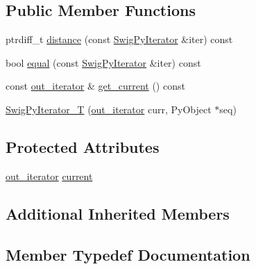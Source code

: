 \subsection*{Public Member Functions}
\begin{DoxyCompactItemize}
\item 
ptrdiff\+\_\+t \hyperlink{classswig_1_1_swig_py_iterator___t_ab98b853b7da59239d8b260be34dbda26}{distance} (const \hyperlink{structswig_1_1_swig_py_iterator}{Swig\+Py\+Iterator} \&iter) const
\item 
bool \hyperlink{classswig_1_1_swig_py_iterator___t_a14f2ba114f370932df0bf1ab06d0a5e2}{equal} (const \hyperlink{structswig_1_1_swig_py_iterator}{Swig\+Py\+Iterator} \&iter) const
\item 
const \hyperlink{classswig_1_1_swig_py_iterator___t_aec35545038c3d804975a147253f061e4}{out\+\_\+iterator} \& \hyperlink{classswig_1_1_swig_py_iterator___t_a5079275c680963f14ba496ebd4f07c7b}{get\+\_\+current} () const
\item 
\hyperlink{classswig_1_1_swig_py_iterator___t_aed627e359856103f6e9b2e939fc85d9c}{Swig\+Py\+Iterator\+\_\+T} (\hyperlink{classswig_1_1_swig_py_iterator___t_aec35545038c3d804975a147253f061e4}{out\+\_\+iterator} curr, Py\+Object $\ast$seq)
\end{DoxyCompactItemize}
\subsection*{Protected Attributes}
\begin{DoxyCompactItemize}
\item 
\hyperlink{classswig_1_1_swig_py_iterator___t_aec35545038c3d804975a147253f061e4}{out\+\_\+iterator} \hyperlink{classswig_1_1_swig_py_iterator___t_a7b69908f19b9150a4d2b357567f8bd82}{current}
\end{DoxyCompactItemize}
\subsection*{Additional Inherited Members}


\subsection{Member Typedef Documentation}
\mbox{\label{classswig_1_1_swig_py_iterator___t_aec35545038c3d804975a147253f061e4}} 
